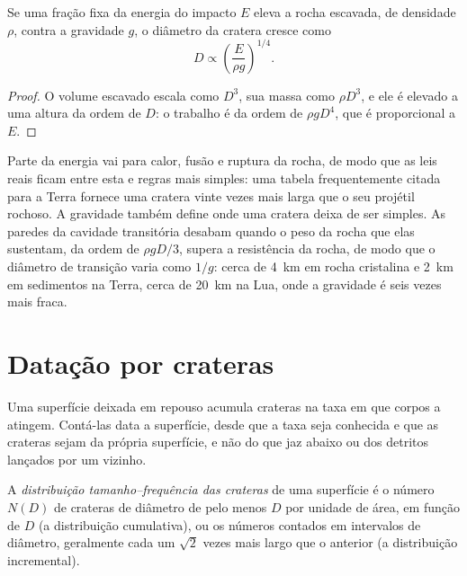 \begin{proposition}\label{prop:b3:planetary-interiors-surfaces:scaling}
Se uma fração fixa da energia do impacto $E$ eleva a rocha escavada, de
densidade $\rho$, contra a gravidade $g$, o diâmetro da cratera cresce como
\[
  D \propto \left(\frac{E}{\rho g}\right)^{1/4} .
\]
\end{proposition}

\begin{proof}
O volume escavado escala como $D^3$, sua massa como $\rho D^3$, e ele é
elevado a uma altura da ordem de $D$: o trabalho é da ordem de $\rho g D^4$, que
é proporcional a $E$.
\end{proof}

Parte da energia vai para calor, fusão e ruptura da rocha, de modo que as
leis reais ficam entre esta e regras mais simples: uma tabela frequentemente
citada para a Terra fornece uma cratera vinte vezes mais larga que o seu
projétil rochoso. A gravidade também define onde uma cratera deixa de ser simples. As
paredes da cavidade transitória desabam quando o peso da rocha que elas sustentam,
da ordem de $\rho g D/3$, supera a resistência da rocha, de modo que o
diâmetro de transição varia como $1/g$: cerca de \qty{4}{km} em rocha cristalina
e \qty{2}{km} em sedimentos na Terra, cerca de \qty{20}{km} na
Lua, onde a gravidade é seis vezes mais fraca.

\section{Datação por crateras}\label{sec:b3:planetary-interiors-surfaces:dating}

Uma superfície deixada em repouso acumula crateras na taxa em que corpos a
atingem. Contá-las data a superfície, desde que a taxa seja conhecida e que as
crateras sejam da própria superfície, e não do que jaz abaixo ou dos
detritos lançados por um vizinho.

\begin{definition}\label{def:b3:planetary-interiors-surfaces:sfd}
A \emph{distribuição tamanho--frequência das crateras}
de uma superfície é o número $N(D)$ de crateras de diâmetro de pelo menos $D$ por
unidade de área, em função de $D$ (a distribuição cumulativa), ou os
números contados em intervalos de diâmetro, geralmente cada um $\sqrt2$ vezes mais largo
que o anterior (a distribuição incremental).
\end{definition}

